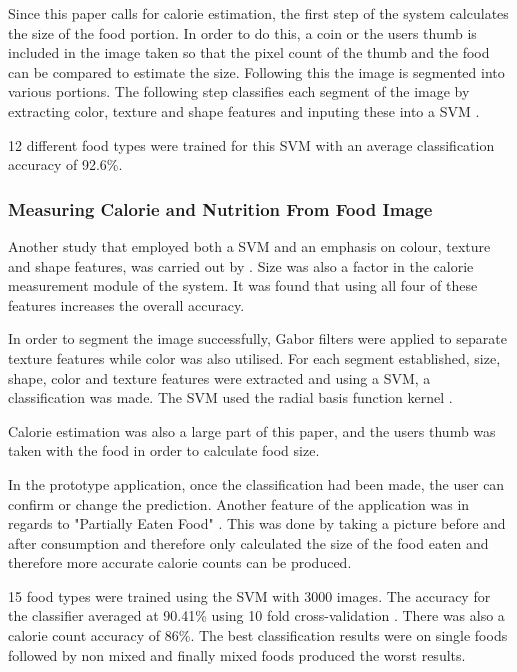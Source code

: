 Since this paper calls for calorie estimation, the first step of the system calculates the size of the food portion. In order to do this, a coin or the users thumb is included in the image taken so that the pixel count of the thumb and the food can be compared to estimate the size. Following this the image is segmented into various portions. The following step classifies each segment of the image by extracting color, texture and shape features and inputing these into a SVM \textcite{novelSVM}.

12 different food types were trained for this SVM with an average classification accuracy of 92.6\%.

\subsubsection*{Measuring Calorie and Nutrition From Food Image}
Another study that employed both a SVM and an emphasis on colour, texture and shape features, was carried out by \textcite{pouladzadeh2014measuring}. Size was also a factor in the calorie measurement module of the system. It was found that using all four of these features increases the overall accuracy.

In order to segment the image successfully, Gabor filters were applied to separate texture features while color was also utilised. For each segment established, size, shape, color and texture features were extracted and using a SVM, a classification was made. The SVM used the radial basis function kernel \textcite{pouladzadeh2014measuring}.

Calorie estimation was also a large part of this paper, and the users thumb was taken with the food in order to calculate food size.

In the prototype application, once the classification had been made, the user can confirm or change the prediction. Another feature of the application was in regards to "Partially Eaten Food" \textcite{pouladzadeh2014measuring}. This was done by taking a picture before and after consumption and therefore only calculated the size of the food eaten and therefore more accurate calorie counts can be produced.

15 food types were trained using the SVM with 3000 images. The accuracy for the classifier averaged at 90.41\% using 10 fold cross-validation \textcite{pouladzadeh2014measuring}. There was also a calorie count accuracy of 86\%. The best classification results were on single foods followed by non mixed and finally mixed foods produced the worst results.

